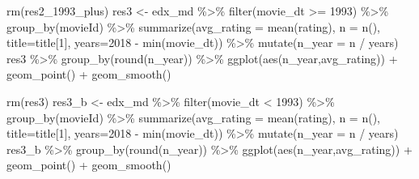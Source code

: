 \documentclass[
]{article}
\newenvironment{Shaded}{}{}
\newcommand{\AttributeTok}[1]{\textcolor[rgb]{0.49,0.56,0.16}{#1}}
\newcommand{\DecValTok}[1]{\textcolor[rgb]{0.25,0.63,0.44}{#1}}
\newcommand{\FunctionTok}[1]{\textcolor[rgb]{0.02,0.16,0.49}{#1}}
\newcommand{\NormalTok}[1]{#1}
\newcommand{\OtherTok}[1]{\textcolor[rgb]{0.00,0.44,0.13}{#1}}
\newcommand{\SpecialCharTok}[1]{\textcolor[rgb]{0.25,0.44,0.63}{#1}}
\begin{document}
\begin{Shaded}
\begin{Highlighting}[]
\FunctionTok{rm}\NormalTok{(res2\_1993\_plus)}
\NormalTok{res3 }\OtherTok{\textless{}{-}}\NormalTok{ edx\_md }\SpecialCharTok{\%\textgreater{}\%}
  \FunctionTok{filter}\NormalTok{(movie\_dt }\SpecialCharTok{\textgreater{}=} \DecValTok{1993}\NormalTok{) }\SpecialCharTok{\%\textgreater{}\%}
  \FunctionTok{group\_by}\NormalTok{(movieId) }\SpecialCharTok{\%\textgreater{}\%}
  \FunctionTok{summarize}\NormalTok{(}\AttributeTok{avg\_rating =} \FunctionTok{mean}\NormalTok{(rating), }\AttributeTok{n =} \FunctionTok{n}\NormalTok{(), }\AttributeTok{title=}\NormalTok{title[}\DecValTok{1}\NormalTok{], }\AttributeTok{years=}\DecValTok{2018} \SpecialCharTok{{-}} \FunctionTok{min}\NormalTok{(movie\_dt)) }\SpecialCharTok{\%\textgreater{}\%}
  \FunctionTok{mutate}\NormalTok{(}\AttributeTok{n\_year =}\NormalTok{ n }\SpecialCharTok{/}\NormalTok{ years)}
\NormalTok{res3 }\SpecialCharTok{\%\textgreater{}\%} 
  \FunctionTok{group\_by}\NormalTok{(}\FunctionTok{round}\NormalTok{(n\_year)) }\SpecialCharTok{\%\textgreater{}\%} 
  \FunctionTok{ggplot}\NormalTok{(}\FunctionTok{aes}\NormalTok{(n\_year,avg\_rating)) }\SpecialCharTok{+} \FunctionTok{geom\_point}\NormalTok{() }\SpecialCharTok{+} \FunctionTok{geom\_smooth}\NormalTok{()}

\FunctionTok{rm}\NormalTok{(res3)}
\NormalTok{res3\_b }\OtherTok{\textless{}{-}}\NormalTok{ edx\_md }\SpecialCharTok{\%\textgreater{}\%}
  \FunctionTok{filter}\NormalTok{(movie\_dt }\SpecialCharTok{\textless{}} \DecValTok{1993}\NormalTok{) }\SpecialCharTok{\%\textgreater{}\%}
  \FunctionTok{group\_by}\NormalTok{(movieId) }\SpecialCharTok{\%\textgreater{}\%}
  \FunctionTok{summarize}\NormalTok{(}\AttributeTok{avg\_rating =} \FunctionTok{mean}\NormalTok{(rating), }\AttributeTok{n =} \FunctionTok{n}\NormalTok{(), }\AttributeTok{title=}\NormalTok{title[}\DecValTok{1}\NormalTok{], }\AttributeTok{years=}\DecValTok{2018} \SpecialCharTok{{-}} \FunctionTok{min}\NormalTok{(movie\_dt)) }\SpecialCharTok{\%\textgreater{}\%}
  \FunctionTok{mutate}\NormalTok{(}\AttributeTok{n\_year =}\NormalTok{ n }\SpecialCharTok{/}\NormalTok{ years)}
\NormalTok{res3\_b }\SpecialCharTok{\%\textgreater{}\%} 
  \FunctionTok{group\_by}\NormalTok{(}\FunctionTok{round}\NormalTok{(n\_year)) }\SpecialCharTok{\%\textgreater{}\%} 
  \FunctionTok{ggplot}\NormalTok{(}\FunctionTok{aes}\NormalTok{(n\_year,avg\_rating)) }\SpecialCharTok{+} \FunctionTok{geom\_point}\NormalTok{() }\SpecialCharTok{+} \FunctionTok{geom\_smooth}\NormalTok{()}


\end{Highlighting}
\end{Shaded}
\end{document}
